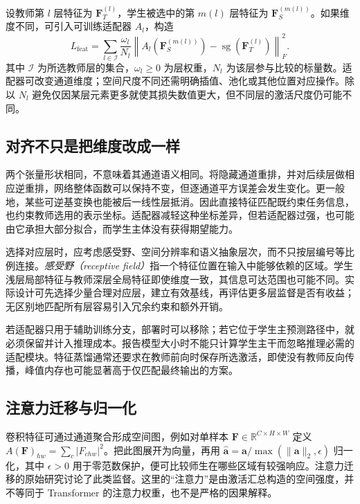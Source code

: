 \documentclass[UTF8,12pt,a4paper,fontset=fandol]{ctexart}
\begin{document}
设教师第 $l$ 层特征为 $\mathbf F_T^{(l)}$，学生被选中的第 $m(l)$ 层特征为 $\mathbf F_S^{(m(l))}$。如果维度不同，可引入可训练适配器 $A_l$，构造
\begin{equation}
 L_{\mathrm{feat}}=\sum_{l\in\mathcal I}\frac{\omega_l}{N_l}
 \left\|A_l(\mathbf F_S^{(m(l))})-
       \operatorname{sg}(\mathbf F_T^{(l)})\right\|_F^2.
 \label{eq:kd-feature-loss}
\end{equation}
其中 $\mathcal I$ 为所选教师层的集合，$\omega_l\geq0$ 为层权重，$N_l$ 为该层参与比较的标量数。适配器可改变通道维度；空间尺度不同还需明确插值、池化或其他位置对应操作。除以 $N_l$ 避免仅因某层元素更多就使其损失数值更大，但不同层的激活尺度仍可能不同。

\subsection{对齐不只是把维度改成一样}
两个张量形状相同，不意味着其通道语义相同。将隐藏通道重排，并对后续层做相应逆重排，网络整体函数可以保持不变，但逐通道平方误差会发生变化。更一般地，某些可逆基变换也能被后一线性层抵消。因此直接特征匹配既约束任务信息，也约束教师选用的表示坐标。适配器减轻这种坐标差异，但若适配器过强，也可能由它承担大部分拟合，而学生主体没有获得期望能力。

选择对应层时，应考虑感受野、空间分辨率和语义抽象层次，而不只按层编号等比例连接。\emph{感受野（receptive field）}指一个特征位置在输入中能够依赖的区域。学生浅层局部特征与教师深层全局特征即使维度一致，其信息可达范围也可能不同。实际设计可先选择少量合理对应层，建立有效基线，再评估更多层监督是否有收益；无区别地匹配所有层容易引入冗余约束和额外开销。

若适配器只用于辅助训练分支，部署时可以移除；若它位于学生主预测路径中，就必须保留并计入推理成本。报告模型大小时不能只计算学生主干而忽略推理必需的适配模块。特征蒸馏通常还要求在教师前向时保存所选激活，即使没有教师反向传播，峰值内存也可能显著高于仅匹配最终输出的方案。

\subsection{注意力迁移与归一化}
卷积特征可通过通道聚合形成空间图，例如对单样本 $\mathbf F\in\mathbb R^{C\times H\times W}$ 定义 $A(\mathbf F)_{hw}=\sum_c|F_{chw}|^2$。把此图展开为向量，再用 $\widehat{\mathbf a}=\mathbf a/\max(\|\mathbf a\|_2,\epsilon)$ 归一化，其中 $\epsilon>0$ 用于零范数保护，便可比较师生在哪些区域有较强响应。注意力迁移的原始研究讨论了此类监督\cite{zagoruyko2017}。这里的“注意力”是由激活汇总构造的空间强度，并不等同于 Transformer 的注意力权重，也不是严格的因果解释。
\end{document}
